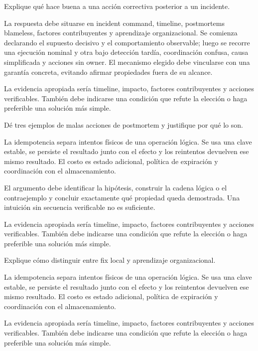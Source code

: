 \documentclass[variant=guia,cover=institutional,mode=screen]{ua-engineering-v6-article}
\begin{document}
\begin{uaexercise}
Explique qué hace buena a una acción correctiva posterior a un incidente.
\end{uaexercise}
\begin{uaanswer}
La respuesta debe situarse en incident command, timeline, postmortems blameless, factores contribuyentes y aprendizaje organizacional. Se comienza declarando el supuesto decisivo y el comportamiento observable; luego se recorre una ejecución nominal y otra bajo detección tardía, coordinación confusa, causa simplificada y acciones sin owner. El mecanismo elegido debe vincularse con una garantía concreta, evitando afirmar propiedades fuera de su alcance.

La evidencia apropiada sería timeline, impacto, factores contribuyentes y acciones verificables. También debe indicarse una condición que refute la elección o haga preferible una solución más simple.
\end{uaanswer}

\begin{uaexercise}
Dé tres ejemplos de malas acciones de postmortem y justifique por qué lo son.
\end{uaexercise}
\begin{uaanswer}
La idempotencia separa intentos físicos de una operación lógica. Se usa una clave estable, se persiste el resultado junto con el efecto y los reintentos devuelven ese mismo resultado. El costo es estado adicional, política de expiración y coordinación con el almacenamiento.

El argumento debe identificar la hipótesis, construir la cadena lógica o el contraejemplo y concluir exactamente qué propiedad queda demostrada. Una intuición sin secuencia verificable no es suficiente.

La evidencia apropiada sería timeline, impacto, factores contribuyentes y acciones verificables. También debe indicarse una condición que refute la elección o haga preferible una solución más simple.
\end{uaanswer}

\begin{uaexercise}
Explique cómo distinguir entre fix local y aprendizaje organizacional.
\end{uaexercise}
\begin{uaanswer}
La idempotencia separa intentos físicos de una operación lógica. Se usa una clave estable, se persiste el resultado junto con el efecto y los reintentos devuelven ese mismo resultado. El costo es estado adicional, política de expiración y coordinación con el almacenamiento.

La evidencia apropiada sería timeline, impacto, factores contribuyentes y acciones verificables. También debe indicarse una condición que refute la elección o haga preferible una solución más simple.
\end{uaanswer}
\end{document}
